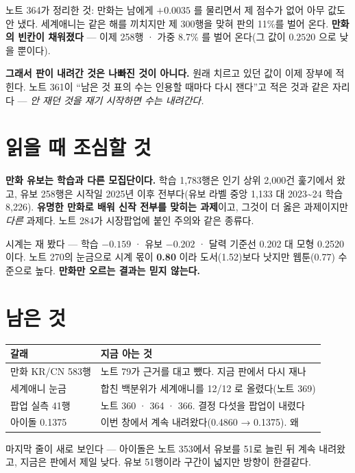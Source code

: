 \documentclass[11pt]{article}
\begin{document}
노트 364가 정리한 것: 만화는 남에게 $+0.0035$ 를 물리면서 제 점수가
없어 아무 값도 안 냈다. 세계애니는 같은 해를 끼치지만 제 300행을 맞혀
판의 11\%를 벌어 온다. \textbf{만화의 빈칸이 채워졌다} --- 이제 258행 ·
가중 8.7\% 를 벌어 온다(그 값이 $0.2520$ 으로 낮을 뿐이다).

\textbf{그래서 판이 내려간 것은 나빠진 것이 아니다.} 원래 치르고 있던
값이 이제 장부에 적힌다. 노트 361이 ``남은 것 표의 수는 인용할 때마다
다시 잰다''고 적은 것과 같은 자리다 --- \emph{안 재던 것을 재기 시작하면
수는 내려간다.}

\section{읽을 때 조심할 것}

\textbf{만화 유보는 학습과 다른 모집단이다.} 학습 1,783행은 인기 상위
2,000건 훑기에서 왔고, 유보 258행은 시작일 2025년 이후 전부다(유보 라벨
중앙 1,133 대 2023\textasciitilde{}24 학습 8,226). \textbf{유명한 만화로 배워
신작 전부를 맞히는 과제}이고, 그것이 더 옳은 과제이지만 \emph{다른}
과제다. 노트 284가 시장팝업에 붙인 주의와 같은 종류다.

시계는 재 봤다 --- 학습 $-0.159$ · 유보 $-0.202$ · 달력 기준선 0.202 대
모형 0.2520 이다. 노트 270의 눈금으로 시계 몫이 \textbf{0.80} 이라
도서(1.52)보다 낫지만 웹툰(0.77) 수준으로 높다. \textbf{만화만 오르는
결과는 믿지 않는다.}

\section{남은 것}

\begin{center}
\begin{tabular}{ll}
\hline
갈래 & 지금 아는 것 \\
\hline
만화 KR/CN 583행 & 노트 79가 근거를 대고 뺐다. 지금 판에서 다시 재나 \\
세계애니 눈금 & 합친 백분위가 세계애니를 12/12 로 올렸다(노트 369) \\
팝업 실측 41행 & 노트 360 · 364 · 366. 결정 다섯을 팝업이 내렸다 \\
아이돌 0.1375 & 이번 창에서 계속 내려왔다(0.4860 → 0.1375). 왜 \\
\hline
\end{tabular}
\end{center}

마지막 줄이 새로 보인다 --- 아이돌은 노트 353에서 유보를 51로 늘린 뒤
계속 내려왔고, 지금은 판에서 제일 낮다. 유보 51행이라 구간이 넓지만
방향이 한결같다.
\end{document}
